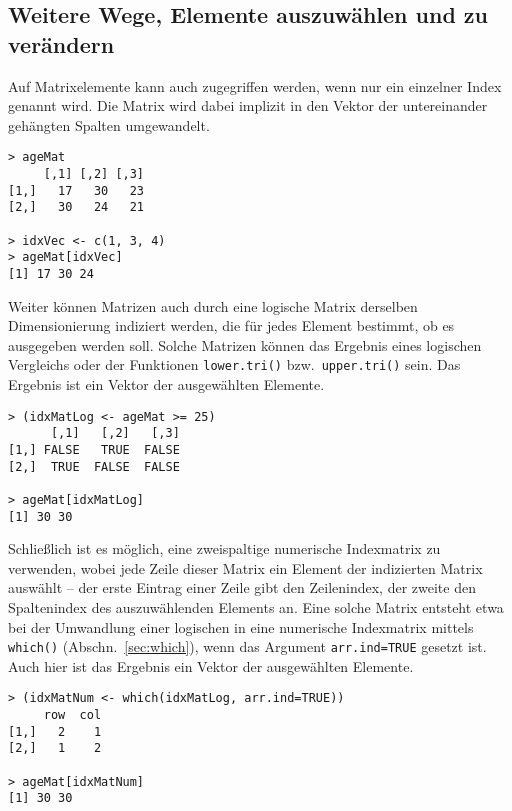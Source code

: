 \subsection{Weitere Wege, Elemente auszuwählen und zu verändern}
\label{sec:matrix_selother}

Auf Matrixelemente kann auch zugegriffen werden, wenn nur ein einzelner Index genannt wird. Die Matrix wird dabei implizit in den Vektor der untereinander gehängten Spalten umgewandelt.
\begin{lstlisting}
> ageMat
     [,1] [,2] [,3]
[1,]   17   30   23
[2,]   30   24   21

> idxVec <- c(1, 3, 4)
> ageMat[idxVec]
[1] 17 30 24
\end{lstlisting}

Weiter können Matrizen auch durch eine logische Matrix derselben Dimensionierung indiziert werden, die für jedes Element bestimmt, ob es ausgegeben werden soll. Solche Matrizen können das Ergebnis eines logischen Vergleichs oder der Funktionen \lstinline!lower.tri()! bzw.\ \lstinline!upper.tri()! sein. Das Ergebnis ist ein Vektor der ausgewählten Elemente.
\begin{lstlisting}
> (idxMatLog <- ageMat >= 25)
      [,1]   [,2]   [,3]
[1,] FALSE   TRUE  FALSE
[2,]  TRUE  FALSE  FALSE

> ageMat[idxMatLog]
[1] 30 30
\end{lstlisting}

Schließlich ist es möglich, eine zweispaltige numerische Indexmatrix zu verwenden, wobei jede Zeile dieser Matrix ein Element der indizierten Matrix auswählt -- der erste Eintrag einer Zeile gibt den Zeilenindex, der zweite den Spaltenindex des auszuwählenden Elements an. Eine solche Matrix entsteht etwa bei der Umwandlung einer logischen in eine numerische Indexmatrix mittels \lstinline!which()! (Abschn.\ \ref{sec:which}), wenn das Argument \lstinline!arr.ind=TRUE! gesetzt ist. Auch hier ist das Ergebnis ein Vektor der ausgewählten Elemente.
\begin{lstlisting}
> (idxMatNum <- which(idxMatLog, arr.ind=TRUE))
     row  col
[1,]   2    1
[2,]   1    2

> ageMat[idxMatNum]
[1] 30 30
\end{lstlisting}

